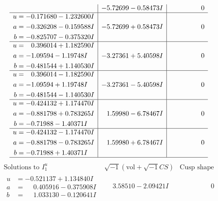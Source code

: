 \documentclass[1p]{elsarticle_modified}
\theoremstyle{definition}
\newcommand{\I}{\sqrt{-1}}
\begin{document}
$$\begin{array}{c|c|c}
 & -5.72699 - 0.58473 I & \phantom{-0.000000 } 0 \\ \hline\begin{aligned}
u &= -0.171680 - 1.232600 I \\
a &= -0.326208 - 0.159588 I \\
b &= -0.825707 - 0.375320 I\end{aligned}
 & -5.72699 + 0.58473 I & \phantom{-0.000000 } 0 \\ \hline\begin{aligned}
u &= \phantom{-}0.396014 + 1.182590 I \\
a &= -1.09594 - 1.19748 I \\
b &= -0.481544 + 1.140530 I\end{aligned}
 & -3.27361 + 5.40598 I & \phantom{-0.000000 } 0 \\ \hline\begin{aligned}
u &= \phantom{-}0.396014 - 1.182590 I \\
a &= -1.09594 + 1.19748 I \\
b &= -0.481544 - 1.140530 I\end{aligned}
 & -3.27361 - 5.40598 I & \phantom{-0.000000 } 0 \\ \hline\begin{aligned}
u &= -0.424132 + 1.174470 I \\
a &= -0.881798 + 0.783265 I \\
b &= -0.71988 - 1.40371 I\end{aligned}
 & \phantom{-}1.59980 - 6.78467 I & \phantom{-0.000000 } 0 \\ \hline\begin{aligned}
u &= -0.424132 - 1.174470 I \\
a &= -0.881798 - 0.783265 I \\
b &= -0.71988 + 1.40371 I\end{aligned}
 & \phantom{-}1.59980 + 6.78467 I & \phantom{-0.000000 } 0\\
 \hline 
 \end{array}$$\newpage$$\begin{array}{c|c|c}  
\text{Solutions to }I^u_{1}& \I (\text{vol} + \sqrt{-1}CS) & \text{Cusp shape}\\
 \hline 
\begin{aligned}
u &= -0.521137 + 1.134840 I \\
a &= \phantom{-}0.405916 - 0.375908 I \\
b &= \phantom{-}1.033130 - 0.120641 I\end{aligned}
 & \phantom{-}3.58510 - 2.09421 I & \phantom{-0.000000 } 0 \\ \hline\begin{aligned}

\end{aligned}
\end{array}$$
\end{document}
